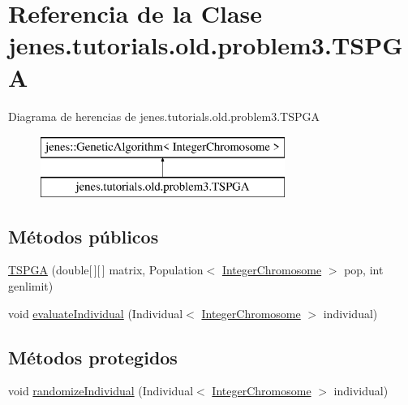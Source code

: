 \hypertarget{classjenes_1_1tutorials_1_1old_1_1problem3_1_1_t_s_p_g_a}{\section{Referencia de la Clase jenes.\-tutorials.\-old.\-problem3.\-T\-S\-P\-G\-A}
\label{classjenes_1_1tutorials_1_1old_1_1problem3_1_1_t_s_p_g_a}
}
Diagrama de herencias de jenes.\-tutorials.\-old.\-problem3.\-T\-S\-P\-G\-A\begin{figure}[H]
\begin{center}
\leavevmode
\includegraphics[height=2.000000cm]{classjenes_1_1tutorials_1_1old_1_1problem3_1_1_t_s_p_g_a}
\end{center}
\end{figure}
\subsection*{Métodos públicos}
\begin{DoxyCompactItemize}
\item 
\hyperlink{classjenes_1_1tutorials_1_1old_1_1problem3_1_1_t_s_p_g_a_aee42308116b327b1b73b5996bcb39aba}{T\-S\-P\-G\-A} (double\mbox{[}$\,$\mbox{]}\mbox{[}$\,$\mbox{]} matrix, Population$<$ \hyperlink{classjenes_1_1chromosome_1_1_integer_chromosome}{Integer\-Chromosome} $>$ pop, int genlimit)
\item 
void \hyperlink{classjenes_1_1tutorials_1_1old_1_1problem3_1_1_t_s_p_g_a_a4485dcb637c0d0352c4372e4bef4da18}{evaluate\-Individual} (Individual$<$ \hyperlink{classjenes_1_1chromosome_1_1_integer_chromosome}{Integer\-Chromosome} $>$ individual)
\end{DoxyCompactItemize}
\subsection*{Métodos protegidos}
\begin{DoxyCompactItemize}
\item 
void \hyperlink{classjenes_1_1tutorials_1_1old_1_1problem3_1_1_t_s_p_g_a_ae2fb356349da4c72fec6398f226877c9}{randomize\-Individual} (Individual$<$ \hyperlink{classjenes_1_1chromosome_1_1_integer_chromosome}{Integer\-Chromosome} $>$ individual)
\end{DoxyCompactItemize}


